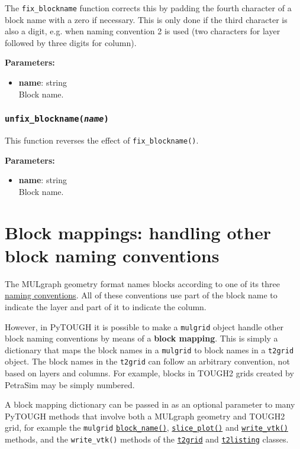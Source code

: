 The \texttt{fix\_blockname} function corrects this by padding the fourth character of a block name with a zero if necessary.  This is only done if the third character is also a digit, e.g. when naming convention 2 is used (two characters for layer followed by three digits for column).

\textbf{Parameters:}
\begin{itemize}
\item \textbf{name}: string\\
  Block name.
\end{itemize}

\begin{snugshade}
\subsubsection{\texttt{unfix\_blockname(\emph{name})}}
\end{snugshade}

This function reverses the effect of \texttt{fix\_blockname()}.

\textbf{Parameters:}
\begin{itemize}
\item \textbf{name}: string\\
  Block name.
\end{itemize}

\section{Block mappings: handling other block naming conventions}
\label{sec:mulgrid:blockmappings}

The MULgraph geometry format names blocks according to one of its three \hyperref[geometry_format_conventions]{naming conventions}. All of these conventions use part of the block name to indicate the layer and part of it to indicate the column.

However, in PyTOUGH it is possible to make a \texttt{mulgrid} object handle other block naming conventions by means of a \textbf{block mapping}. This is simply a dictionary that maps the block names in a \texttt{mulgrid} to block names in a \texttt{t2grid} object. The block names in the \texttt{t2grid} can follow an arbitrary convention, not based on layers and columns. For example, blocks in TOUGH2 grids created by PetraSim may be simply numbered.

A block mapping dictionary can be passed in as an optional parameter to many PyTOUGH methods that involve both a MULgraph geometry and TOUGH2 grid, for example the \texttt{mulgrid} \hyperref[sec:mulgrid:block_name]{\texttt{block\_name()}}, \hyperref[sec:mulgrid:slice_plot]{\texttt{slice\_plot()}} and \hyperref[sec:mulgrid:write_vtk]{\texttt{write\_vtk()}} methods, and the \texttt{write\_vtk()} methods of the \hyperref[sec:t2grid:write_vtk]{\texttt{t2grid}} and \hyperref[sec:t2listing:write_vtk]{\texttt{t2listing}} classes.

